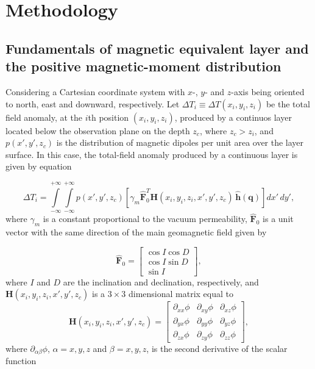 \section{Methodology}
\label{sec:methodology}

\subsection{Fundamentals of magnetic equivalent layer and the positive magnetic-moment distribution}
\label{subsec:mag_eqlayer}

Considering a Cartesian coordinate system with $x$-, $y$- and $z$-axis being oriented to north, east and downward, respectively. Let $\Delta T_i \equiv \Delta T (x_i,y_i,z_i)$ be the total field anomaly, at the $i$th position $(x_i,y_i,z_i)$, produced by a continuos layer located below the observation plane on the depth $z_c$, where $z_c > z_i$, and $p(x',y',z_c)$ is the distribution of magnetic dipoles per unit area over the layer surface. In this case, the total-field anomaly produced by a continuous layer is given by equation 

\begin{equation}
\Delta T_i = \int \limits_{-\infty}^{+\infty } \int \limits_{-\infty}^{+\infty }  p(x',y',z_c)  [\gamma_m \hat{\mathbf{F}}_0^T \mathbf{H}(x_i,y_i,z_i,x',y',z_c) \,\hat{\mathbf{h}}(\mathbf{q})] dx' \,dy',
\label{eq:continuous_layer}
\end{equation}
where $\gamma_m$ is a constant proportional to the vacuum permeability, $\hat{\mathbf{F}}_0$ is a unit vector with the same direction of the main geomagnetic field given by

\begin{equation}
	\hat{\mathbf{F}}_0 =
	\left[ \begin{array}{c}
		 \cos I \cos D \\
		 \cos I \sin D \\
		 \sin I     
	\end{array} \right] ,
	\label{eq:main_field}
\end{equation}
where $I$ and $D$ are the inclination and declination, respectively, and $\mathbf{H}(x_i,y_i,z_i,x',y',z_c)$ is a $3 \times 3$ dimensional matrix equal to  
\begin{equation}
\mathbf{H}(x_i,y_i,z_i,x',y',z_c) =
\left[ \begin{array}{ccc}
\partial_{xx} \phi & \partial_{xy} \phi &\partial_{xz} \phi \\  \partial_{yx} \phi & \partial_{yy} \phi &\partial_{yz} \phi \\  \partial_{zx} \phi &\partial_{zy}\phi  & \partial_{zz} \phi    
\end{array} \right] ,
\label{eq:H}
\end{equation}
where $\partial_{\alpha \beta} \phi$, $\alpha = x, y, z$ and $\beta = x, y, z$, is the second derivative of the scalar function 

